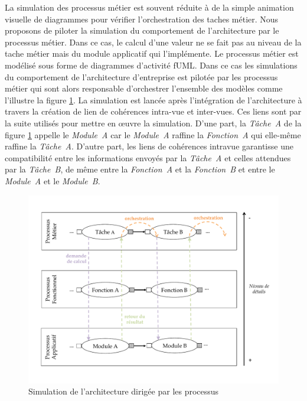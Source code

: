 La simulation des processus métier est souvent réduite à de la simple animation
visuelle de diagrammes pour vérifier l'orchestration des taches métier. Nous
proposons de piloter la simulation du comportement de l'architecture par le
processus métier. Dans ce cas, le calcul d'une valeur ne se fait pas au niveau
de la tache métier mais du module applicatif qui l'implémente. Le processus
métier est modélisé sous forme de diagrammes d'activité fUML. Dans ce cas les
simulations du comportement de l'architecture d'entreprise est pilotée par les
processus métier qui sont alors responsable d'orchestrer l'ensemble des modèles
comme l'illustre la figure \ref{fig:Simulation_Approche}. La simulation est
lancée après l'intégration de l'architecture à travers la création de lien de
cohérences intra-vue et inter-vues. Ces liens sont par la suite utilisés pour
mettre en œuvre la simulation. D'une part, la \textit{Tâche~A} de la figure
\ref{fig:Simulation_Approche} appelle le \textit{Module~A} car le
\textit{Module~A} raffine la \textit{Fonction~A} qui elle-même raffine la
\textit{Tâche~A}. D'autre part, les liens de cohérences intravue garantisse une
compatibilité entre les informations envoyés par la \textit{Tâche~A} et celles
attendues par la \textit{Tâche~B}, de même entre la \textit{Fonction~A} et la
\textit{Fonction~B} et entre le \textit{Module~A} et le \textit{Module~B}.

\begin{figure}[!ht]
    \begin{center}
        \includegraphics[trim= 0cm 3cm 0cm 0cm, width=1\textwidth]{figures/4_demarche/approche_simulation.pdf}
    \end{center}
    \caption{Simulation de l'architecture dirigée par les processus}
    \label{fig:Simulation_Approche}
\end{figure}

